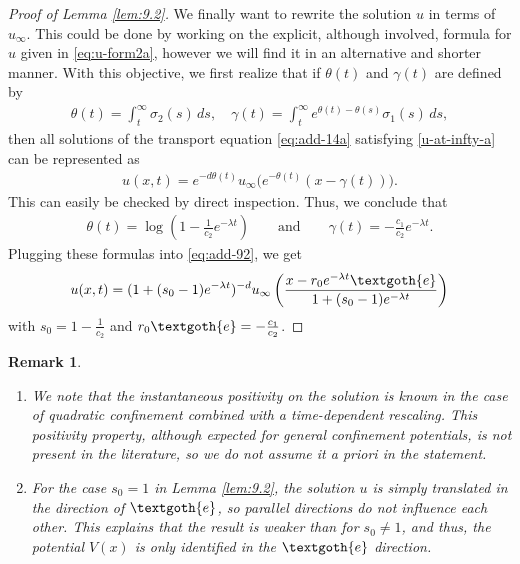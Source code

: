 \documentclass[reqno]{amsart}
\newtheorem{remark}[lemma]{Remark}
\begin{document}
\begin{proof}[Proof of Lemma \ref{lem:9.2}]
We finally want to rewrite the solution $u$ in terms of $u_\infty$. This could be done by working on the explicit, although involved, formula for $u$ given in \eqref{eq:u-form2a}, however we will find it in an alternative and shorter manner. With this objective, we first realize that if $\theta(t)$ and $\gamma(t)$ are defined by
\begin{align*}
    \theta(t) = \int_t^\infty\sigma_2(s)\,d s,
    \quad
    \gamma(t)= \int_t^\infty e^{\theta(t)-\theta(s)}\sigma_1(s)\,d s,
  \end{align*}
then all solutions of the transport equation \eqref{eq:add-14a} satisfying \eqref{u-at-infty-a} can be represented as
\begin{align}
    \label{eq:add-92}
    u(x,t) = e^{-d\theta(t)}u_\infty\big(e^{-\theta(t)}(x-\gamma(t))\big).
\end{align}
This can easily be checked by direct inspection. Thus, we conclude that
\begin{align*}
    \theta(t) = \log\left(1-\frac{1}{c_2}e^{-\lambda t}\right)
    \qquad \mbox{and} \qquad
    \gamma(t)= -\frac{c_1}{c_2}e^{-\lambda t}.
  \end{align*}
Plugging these formulas into \eqref{eq:add-92}, we get
$$
u(x,t) = (1+(s_0-1)e^{-\lambda t})^{-d}u_\infty\left(\frac{x-r_0e^{-\lambda t}\textgoth{e}}{1+(s_0-1)e^{-\lambda t}}\right)
$$
with $s_0=1-\frac{1}{c_2}$ and $r_0\textgoth{e}=-\frac{c_1}{c_2}$.
\end{proof}

\begin{remark}\
\begin{enumerate}
\item[(a)] We note that the instantaneous positivity on the solution is known in the case of quadratic confinement \cite{BV06} combined with a time-dependent rescaling. This positivity property, although expected for general confinement potentials, is not present in the literature, so we do not assume it a priori in the statement.
\item[(b)] For the case $s_0=1$ in Lemma \ref{lem:9.2}, the solution $u$ is simply translated in the direction of $\textgoth{e}$, so parallel directions do not influence each other. This explains that the result is weaker than for $s_0\neq 1$, and thus, the potential $V(x)$ is only identified in the $\textgoth{e}$ direction.
\end{enumerate}
\end{remark}
%
\end{document}
